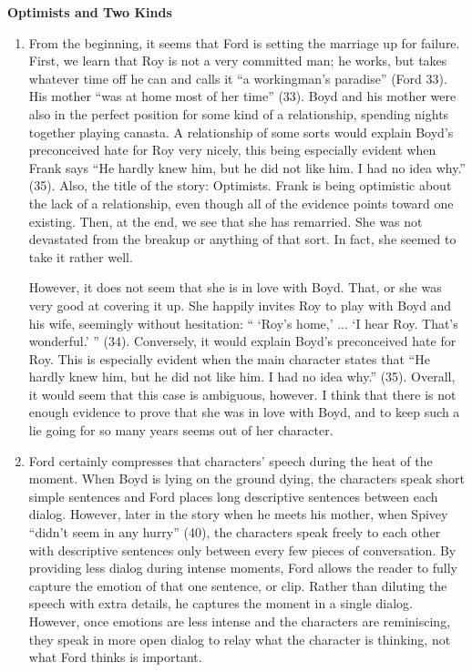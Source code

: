 \documentclass[12pt,letterpaper]{article}
\begin{document}
{\center\textbf{Optimists and Two Kinds} \\}

\begin{enumerate}

\item From the beginning, it seems that Ford is setting the marriage up for
failure.  First, we learn that Roy is not a very committed man; he works, but
takes whatever time off he can and calls it ``a workingman's paradise'' (Ford
33).  His mother ``was at home most of her time'' (33).  Boyd and his mother
were also in the perfect position for some kind of a relationship, spending
nights together playing canasta.  A relationship of some sorts would explain
Boyd's preconceived hate for Roy very nicely, this being especially evident when
Frank says ``He hardly knew him, but he did not like him.  I had no idea why.''
(35).  Also, the title of the story: Optimists.  Frank is being optimistic about
the lack of a relationship, even though all of the evidence points toward one
existing.  Then, at the end, we see that she has remarried.  She was not
devastated from the breakup or anything of that sort.  In fact, she seemed to
take it rather well.

However, it does not seem that she is in love with
Boyd.  That, or she was very good at covering it up.  She happily invites Roy to
play with Boyd and his wife, seemingly without hesitation: `` `Roy's home,' ...
`I hear Roy.  That's wonderful.' '' (34).  Conversely, it would explain Boyd's
preconceived hate for Roy.  This is especially evident when the main character
states that ``He hardly knew him, but he did not like him.  I had no idea why.''
(35).  Overall, it would seem that this case is ambiguous, however.  I think
that there is not enough evidence to prove that she was in love with Boyd, and
to keep such a lie going for so many years seems out of her character.

\item Ford certainly compresses that characters' speech during the heat of the
moment.  When Boyd is lying on the ground dying, the characters speak short
simple sentences and Ford places long descriptive sentences between each dialog.
However, later in the story when he meets his mother, when Spivey ``didn't seem
in any hurry'' (40), the characters speak freely to each other with descriptive
sentences only between every few pieces of conversation.  By providing less
dialog during intense moments, Ford allows the reader to fully capture the
emotion of that one sentence, or clip.  Rather than diluting the speech with
extra details, he captures the moment in a single dialog.  However, once
emotions are less intense and the characters are reminiscing, they speak in more
open dialog to relay what the character is thinking, not what Ford thinks is
important.


\end{enumerate}
\end{document}
